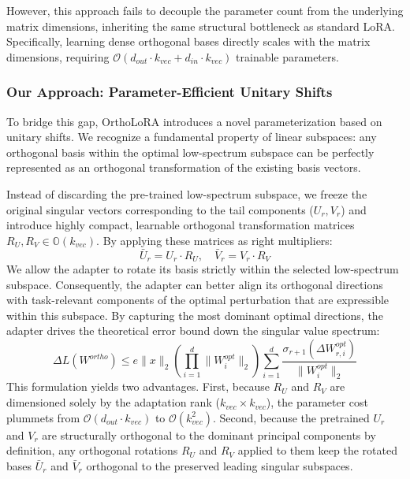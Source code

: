 However, this approach fails to decouple the parameter count from the underlying matrix dimensions, inheriting the same structural bottleneck as standard LoRA. Specifically, learning dense orthogonal bases directly scales with the matrix dimensions, requiring $\mathcal{O}(d_{out} \cdot k_{vec} + d_{in} \cdot k_{vec})$ trainable parameters.

\subsubsection{Our Approach: Parameter-Efficient Unitary Shifts}

To bridge this gap, OrthoLoRA introduces a novel parameterization based on unitary shifts. We recognize a fundamental property of linear subspaces: any orthogonal basis within the optimal low-spectrum subspace can be perfectly represented as an orthogonal transformation of the existing basis vectors.

Instead of discarding the pre-trained low-spectrum subspace, we freeze the original singular vectors corresponding to the tail components ($U_{r}, V_{r}$) and introduce highly compact, learnable orthogonal transformation matrices $R_U, R_V \in \mathbb{O}(k_{vec})$. By applying these matrices as right multipliers:
\[
\bar{U}_{r} = U_{r} \cdot R_U,
\quad
\bar{V}_{r} = V_{r} \cdot R_V
\]
We allow the adapter to rotate its basis strictly within the selected low-spectrum subspace. Consequently, the adapter can better align its orthogonal directions with task-relevant components of the optimal perturbation that are expressible within this subspace. By capturing the most dominant optimal directions, the adapter drives the theoretical error bound down the singular value spectrum:
\[
\Delta L(W^{ortho})
\leq
e \|x\|_2
\left(
\prod_{i=1}^d
\|W^{opt}_{i}\|_2
\right)
\sum_{i=1}^d
\frac{\sigma_{r+1}(\Delta W_{r,i}^{opt})}{\|W^{opt}_{i}\|_2}
\]
This formulation yields two advantages. First, because $R_U$ and $R_V$ are dimensioned solely by the adaptation rank ($k_{vec} \times k_{vec}$), the parameter cost plummets from $\mathcal{O}(d_{out} \cdot k_{vec})$ to $\mathcal{O}(k_{vec}^2)$. Second, because the pretrained \(U_r\) and \(V_r\) are structurally orthogonal
to the dominant principal components by definition, any orthogonal rotations
\(R_U\) and \(R_V\) applied to them keep the rotated bases
\(\bar{U}_r\) and \(\bar{V}_r\) orthogonal to the preserved leading singular subspaces.

